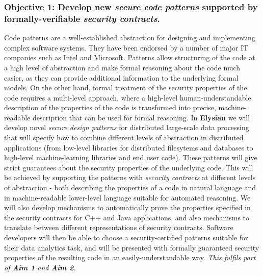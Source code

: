 \documentclass[a4paper,11pt]{article}
\newcommand{\project}[1]{\textbf{#1}\xspace}
\newcommand{\SECURITY}{\project{Elysian}}
\newcommand{\TheProject}{\SECURITY}
\begin{document}
\subsubsection*{Objective 1: Develop new \emph{secure code patterns} supported by formally-verifiable \emph{security contracts}.}
\vspace{-6pt}
Code patterns are a well-established abstraction for designing and implementing complex software systems.  They have been endorsed by a number of major IT companies such as Intel and Microsoft. Patterns allow structuring of the code at a high level of abstraction and make formal reasoning about the code much easier, as they can provide additional information to the underlying formal models. On the other hand, formal treatment of the security properties of the code requires a multi-level approach, where a high-level human-understandable description of the properties of the code is transformed into precise, machine-readable description that can be used for formal reasoning. In \TheProject{} we will develop novel \emph{secure design patterns} for distributed large-scale data processing that will specify how to combine different levels of abstraction in distributed applications (from low-level libraries for distributed filesytems and databases to high-level machine-learning libraries and end user code). These patterns will give strict guarantees about the security properties of the underlying code. This will be achieved by supporting the patterns with \emph{security contracts} at different levels of abstraction - both describing the properties of a code in natural language and in machine-readable lower-level language suitable for automated reasoning. We will also develop mechanisms to automatically prove the properties specified in the security contracts for C++ and Java applications, and also mechanisms to translate between different representations of security contracts. Software developers will then be able to choose a security-certified patterns suitable for their data analytics task, and will be presented with formally guaranteed security properties of the resulting code in an easily-understandable way. \emph{This fulfils part of \textbf{Aim 1} and \textbf{Aim 2}}.
\end{document}
